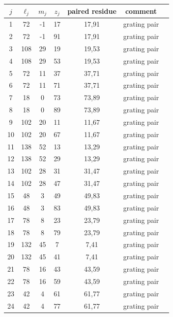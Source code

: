 \documentclass[11pt,a4paper]{article}
\begin{document}
\begin{center}
\begin{tabular}{c|ccc|ccc}
\(j\) & \(\ell_j\) & \(m_j\) & \(z_j\) & paired residue & comment & \\
\hline
1 & 72 & -1 & 17 & 17,91 & grating pair \\
2 & 72 & -1 & 91 & 17,91 & grating pair \\
3 & 108 & 29 & 19 & 19,53 & grating pair \\
4 & 108 & 29 & 53 & 19,53 & grating pair \\
5 & 72 & 11 & 37 & 37,71 & grating pair \\
6 & 72 & 11 & 71 & 37,71 & grating pair \\
7 & 18 & 0 & 73 & 73,89 & grating pair \\
8 & 18 & 0 & 89 & 73,89 & grating pair \\
9 & 102 & 20 & 11 & 11,67 & grating pair \\
10 & 102 & 20 & 67 & 11,67 & grating pair \\
11 & 138 & 52 & 13 & 13,29 & grating pair \\
12 & 138 & 52 & 29 & 13,29 & grating pair \\
13 & 102 & 28 & 31 & 31,47 & grating pair \\
14 & 102 & 28 & 47 & 31,47 & grating pair \\
15 & 48 & 3 & 49 & 49,83 & grating pair \\
16 & 48 & 3 & 83 & 49,83 & grating pair \\
17 & 78 & 8 & 23 & 23,79 & grating pair \\
18 & 78 & 8 & 79 & 23,79 & grating pair \\
19 & 132 & 45 & 7 & 7,41 & grating pair \\
20 & 132 & 45 & 41 & 7,41 & grating pair \\
21 & 78 & 16 & 43 & 43,59 & grating pair \\
22 & 78 & 16 & 59 & 43,59 & grating pair \\
23 & 42 & 4 & 61 & 61,77 & grating pair \\
24 & 42 & 4 & 77 & 61,77 & grating pair
\end{tabular}
\end{center}
\end{document}
